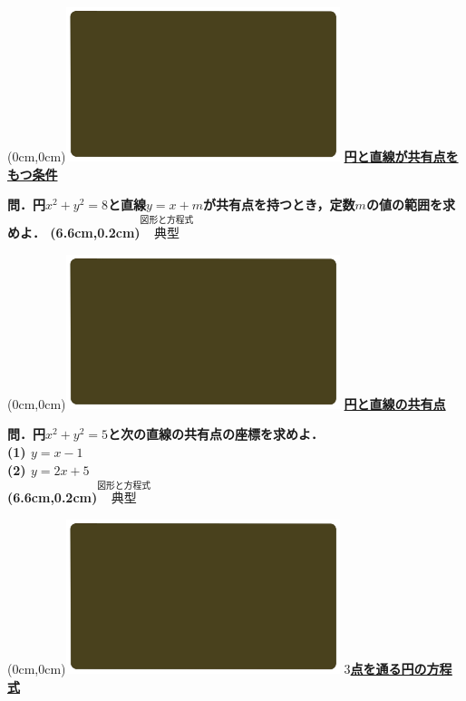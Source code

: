 \documentclass[10pt,
fleqn,
dvipdfmx,
uplatex
]{jsarticle}
\begin{document}
\at(0cm,0cm){\includegraphics[width=8cm,bb=0 0 1920 1080]{./youtube/thumbnails/templates/smart_background/図形と方程式.jpeg}}
{\color{orange}\bf\boldmath\Large\underline{円と直線が共有点をもつ条件}}\vspace{0.3zw}

\LARGE 
\bf\boldmath 問．円$x^2+y^2=8$と直線$y=x+m$が共有点を持つとき，定数$m$の値の範囲を求めよ．
\at(6.6cm,0.2cm){\small\color{bradorange}$\overset{\text{図形と方程式}}{\text{典型}}$}


\newpage



\at(0cm,0cm){\includegraphics[width=8cm,bb=0 0 1920 1080]{./youtube/thumbnails/templates/smart_background/図形と方程式.jpeg}}
{\color{orange}\bf\boldmath\huge\underline{円と直線の共有点}}\vspace{0.3zw}

\Large 
\bf\boldmath 問．円$x^2+y^2=5$と次の直線の共有点の座標を求めよ．\\
(1)  $y=x-1$\\
(2)  $y=2x+5$\\

\at(6.6cm,0.2cm){\small\color{bradorange}$\overset{\text{図形と方程式}}{\text{典型}}$}


\newpage



\at(0cm,0cm){\includegraphics[width=8cm,bb=0 0 1920 1080]{./youtube/thumbnails/templates/smart_background/図形と方程式.jpeg}}
{\color{orange}\bf\boldmath\LARGE\underline{$3$点を通る円の方程式}}\vspace{0.3zw}
\end{document}
